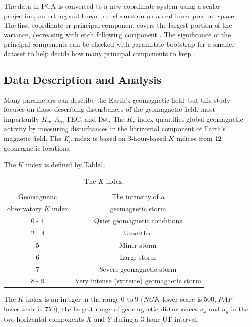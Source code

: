 \documentclass[sn-mathphys-num]{sn-jnl}%
\begin{document}
The data in PCA is converted to a new coordinate system using a scalar projection, an orthogonal linear transformation on a real inner product space. The first coordinate or principal component covers the largest portion of the variance, decreasing with each following component \cite{jolliffe2002principal, bengio2013representation}. The significance of the principal components can be checked with parametric bootstrap for a smaller dataset to help decide how many principal components to keep \cite{forkman2019hypothesis}.

\subsection{Data Description and Analysis}

Many parameters can describe the Earth's geomagnetic field, but this study focuses on those describing disturbances of the geomagnetic field, most importantly $K_p$, $A_p$, TEC, and Dst. The $K_p$ index quantifies global geomagnetic activity by measuring disturbances in the horizontal component of Earth's magnetic field. The $K_p$ index is based on 3-hour-based $K$ indices from 12 geomagnetic locations.

The $K$ index is defined by Table\ref{tab:K}.

\begin{table}[!ht]
    \centering
    \caption{The $K$ index.}
    \label{tab:K}
    \begin{tabular}{|c|c|}
        \hline
        Geomagnetic & The intensity of a \\ 
        observatory $K$ index & geomagnetic storm \\ \hline
        $0$ - $1$ & Quiet geomagnetic conditions \\ \hline
        $2$ - $4$ & Unsettled \\ \hline
        $5$ & Minor storm \\ \hline
        $6$ & Large storm \\ \hline
        $7$ & Severe geomagnetic storm \\ \hline
        $8$ - $9$ & Very intense (extreme) geomagnetic storm \\ \hline
    \end{tabular}
\end{table}

The $K$ index is an integer in the range $0$ to $9$ ($NGK$ lower scare is $500$, $PAF$ lower scale is $750$), the largest range of geomagnetic disturbances $a_x$ and $a_y$ in the two horizontal components $X$ and $Y$ during a $3$-hour UT interval.
\end{document}

